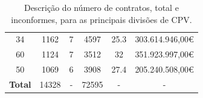 \begin{table}[H]
{\begin{tabular}{cccccc}
			34                   & 1162                                                                                & 7           & 4597                                                                          & 25.3        & 303.614.946,00€                                                           \\
			60                   & 1124                                                                                & 7           & 3512                                                                          & 32          & 351.923.997,00€                                                           \\
			50                   & 1069                                                                                & 6           & 3908                                                                          & 27.4        & 205.240.508,00€                                                           \\ \midrule
			\textbf{Total}       & 14328                                                                               & -           & 72595                                                                         & -           & -                                                                         \\ \hline
		\end{tabular}%
	}
	\caption{Descrição do número de contratos, total e inconformes, para as principais divisões de CPV.}
	\label{tab:rf18stats}
\end{table}


